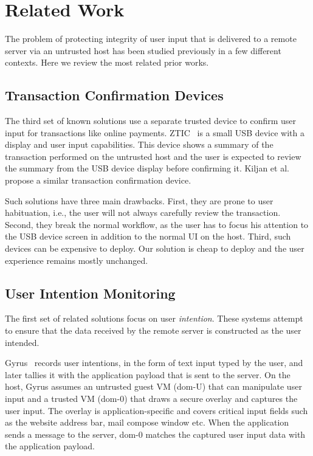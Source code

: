 \section{Related Work}
\label{sec:relatedWork_IK}

The problem of protecting integrity of user input that is delivered to a remote server via an untrusted host has been studied previously in a few different contexts. Here we review the most related prior works.

\subsection{Transaction Confirmation Devices} 

The third set of known solutions use a separate trusted device to confirm user input for transactions like online payments. ZTIC~\cite{weigold2011} is a small USB device with a display and user input capabilities. This device shows a summary of the transaction performed on the untrusted host and the user is expected to review the summary from the USB device display before confirming it. Kiljan et al.~\cite{6978928} propose a similar transaction confirmation device. 

Such solutions have three main drawbacks. First, they are prone to user habituation, i.e., the user will not always carefully review the transaction. Second, they break the normal workflow, as the user has to focus his attention to the USB device screen in addition to the normal UI on the host. Third, such devices can be expensive to deploy. Our solution is cheap to deploy and the user experience remains mostly unchanged. 



\subsection{User Intention Monitoring} 

The first set of related solutions focus on user \emph{intention}. These systems attempt to ensure that the data received by the remote server is constructed as the user intended. 

Gyrus~\cite{gyrus} records user intentions, in the form of text input typed by the user, and later tallies it with the application payload that is sent to the server. On the host, Gyrus assumes an untrusted guest VM (dom-U) that can manipulate user input and a trusted VM (dom-0) that draws a secure overlay and captures the user input. The overlay is application-specific and covers critical input fields such as the website address bar, mail compose window etc. When the application sends a message to the server, dom-0 matches the captured user input data with the application payload. 

